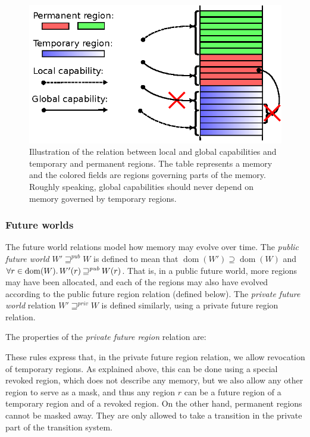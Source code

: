 \documentclass[compsoc,conference,letterpaper,fleqn]{IEEEtran}
\DeclareMathOperator{\dom}{dom}
\newcommand{\var}[1]{\mathit{#1}}
\newcommand{\pub}{\var{pub}}
\newcommand{\futurewk}{\mathbin{\sqsupseteq}^{\var{pub}}}
\newcommand{\futurestr}{\mathbin{\sqsupseteq}^{\var{priv}}}
\newcommand{\plaindom}[1]{\mathrm{#1}}
\newcommand{\Regions}{\plaindom{Region}}
\newcommand{\plainview}[1]{\mathrm{#1}}
\newcommand{\temp}{\plainview{temp}}
\newcommand{\revoked}{\plainview{revoked}}
\begin{document}
\begin{figure}
  \centering
  \includegraphics{w11}
  \caption{Illustration of the relation between local and global capabilities and temporary and permanent regions. The table represents a memory and the colored fields are regions governing parts of the memory. Roughly speaking, global capabilities should never depend on memory governed by temporary regions.}
  \label{fig:cap-world}
\end{figure}

\subsubsection{Future worlds}
The future world relations model how memory may evolve over time. 
The \emph{public future world} 
$W' \futurewk W$ is defined to mean that $\dom(W') \supseteq \dom(W)$
and $\forall r \in \dom(W) \ldotp W'(r) \futurewk W(r)$.  That is,
in a public future world, more regions may have been allocated, and
each of the regions may also have evolved according to the public future
region relation (defined below). The \emph{private future world} relation
$W' \futurestr W$ is defined similarly, using a private future region
relation.

The properties of the \emph{private future region} relation are:
These rules express that, in the private future region relation, we allow
revocation of temporary regions. As explained above, this can be done using a
special revoked region, which does not describe any memory, but we also allow
any other region to serve as a mask, and thus any region $r$ can be a future
region of a temporary region and of a revoked region. On the other hand,
permanent regions cannot be masked away. They are only allowed to take a
transition in the private part of the transition system.
\end{document}
